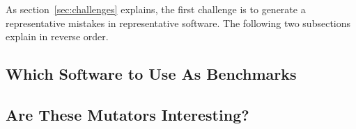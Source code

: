 
As section~\ref{sec:challenges} explains, the first challenge is to
generate a representative mistakes in representative software. The
following two subsections explain in reverse order. 

\def\sub#1#2{\subsection{#2} \label{sub:mutate-#1} }

\sub{benchmarks} {Which Software to Use As Benchmarks}
\sub{interesting}{Are These Mutators Interesting?} 
